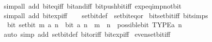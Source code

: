 \begin{isabellebody}
\ {\isacharparenleft}{\kern0pt}simp{\isacharunderscore}{\kern0pt}all\ add{\isacharcolon}{\kern0pt}\ bit{\isacharunderscore}{\kern0pt}eq{\isacharunderscore}{\kern0pt}iff\ bit{\isacharunderscore}{\kern0pt}and{\isacharunderscore}{\kern0pt}iff\ bit{\isacharunderscore}{\kern0pt}push{\isacharunderscore}{\kern0pt}bit{\isacharunderscore}{\kern0pt}iff\ exp{\isacharunderscore}{\kern0pt}eq{\isacharunderscore}{\kern0pt}{}{\isacharunderscore}{\kern0pt}imp{\isacharunderscore}{\kern0pt}not{\isacharunderscore}{\kern0pt}bit{\isacharparenright}{\kern0pt}\isanewline
\ \ \isamarkupfalse%
\ {\isacharparenleft}{\kern0pt}simp{\isacharunderscore}{\kern0pt}all\ add{\isacharcolon}{\kern0pt}\ bit{\isacharunderscore}{\kern0pt}exp{\isacharunderscore}{\kern0pt}iff{\isacharparenright}{\kern0pt}\isanewline
\ \ \isamarkupfalse%
%
\endisatagproof
{\isafoldproof}%
%
\isadelimproof
\isanewline
%
\endisadelimproof
\isanewline
{}\isamarkupfalse%
\ set{\isacharunderscore}{\kern0pt}bit{\isacharunderscore}{\kern0pt}def\ {\isacharequal}{\kern0pt}\ set{\isacharunderscore}{\kern0pt}bit{\isacharunderscore}{\kern0pt}eq{\isacharunderscore}{\kern0pt}or\isanewline
\isanewline
{}\isamarkupfalse%
\ bit{\isacharunderscore}{\kern0pt}set{\isacharunderscore}{\kern0pt}bit{\isacharunderscore}{\kern0pt}iff\ {\isacharbrackleft}{\kern0pt}bit{\isacharunderscore}{\kern0pt}simps{\isacharbrackright}{\kern0pt}{\isacharcolon}{\kern0pt}\isanewline
\ \ {\isacartoucheopen}bit\ {\isacharparenleft}{\kern0pt}set{\isacharunderscore}{\kern0pt}bit\ m\ a{\isacharparenright}{\kern0pt}\ n\ {\isasymlongleftrightarrow}\ bit\ a\ n\ {\isasymor}\ {\isacharparenleft}{\kern0pt}m\ {\isacharequal}{\kern0pt}\ n\ {\isasymand}\ possible{\isacharunderscore}{\kern0pt}bit\ TYPE{\isacharparenleft}{\kern0pt}{\isacharprime}{\kern0pt}a{\isacharparenright}{\kern0pt}\ n{\isacharparenright}{\kern0pt}{\isacartoucheclose}\isanewline
%
\isadelimproof
\ \ %
\endisadelimproof
%
\isatagproof
{}\isamarkupfalse%
\ {\isacharparenleft}{\kern0pt}auto\ simp\ add{\isacharcolon}{\kern0pt}\ set{\isacharunderscore}{\kern0pt}bit{\isacharunderscore}{\kern0pt}def\ bit{\isacharunderscore}{\kern0pt}or{\isacharunderscore}{\kern0pt}iff\ bit{\isacharunderscore}{\kern0pt}exp{\isacharunderscore}{\kern0pt}iff{\isacharparenright}{\kern0pt}%
\endisatagproof
{\isafoldproof}%
%
\isadelimproof
\isanewline
%
\endisadelimproof
\isanewline
{}\isamarkupfalse%
\ even{\isacharunderscore}{\kern0pt}set{\isacharunderscore}{\kern0pt}bit{\isacharunderscore}{\kern0pt}iff{\isacharcolon}{\kern0pt}\isanewline

\end{isabellebody}

